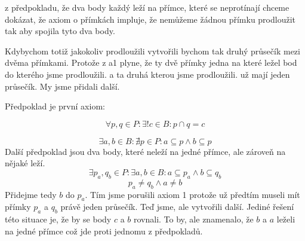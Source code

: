 \documentclass{article}
\begin{document}
z předpokladu, že dva body každý leží na přímce, které se neprotínají chceme
dokázat, že axiom o přímkách impluje, že nemůžeme žádnou přímku prodloužit tak
aby spojila tyto dva body. 

Kdybychom totiž jakokoliv prodloužili vytvořili bychom tak druhý průsečík mezi
dvěma přímkami. Protože z a1 plyne, že ty dvě přímky jedna na které ležel bod do
kterého jsme prodloužili. a ta druhá kterou jsme prodloužili. už mají jeden
průsečík. My jsme přidali další.



Předpoklad je první axiom:

\[
 \forall p,q \in P: \exists! c \in B:p \cap q = c
\]


\[
 \exists a,b \in B:\nexists p \in  P: a \subseteq p \wedge b \subseteq p
\]
Další předpoklad jsou dva body, které neleží na jedné přímce, ale zároveň na
nějaké leží.
\[
 \exists p_a,q_b \in P: \exists a,b \in B: a \subseteq p_a \wedge b \subseteq
 q_b
\]
\[
 p_a \neq q_b \wedge a \neq b
\]
Přidejme tedy $b$ do $p_a$. Tím jsme porušili axiom 1 protože už předtím museli
mít přímky $p_a$ a $q_b$ právě jeden průsečík. Teď jsme, ale vytvořili další.
Jediné řešení této situace je, že by se body $c$ a $b$ rovnali. To by, ale
znamenalo, že $b$ a $a$ leželi na jedné přímce což jde proti jednomu z
předpokladů. 
\end{document}
